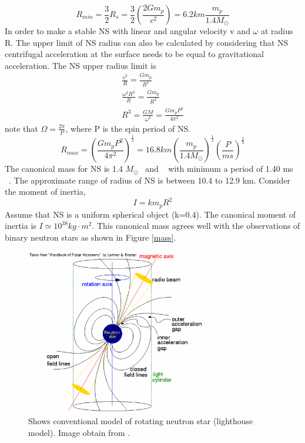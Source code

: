 \documentclass[thesis_msc.tex]{subfiles}
\begin{document}
        \begin{equation} \label{rmin}
    R_{min}=\frac{3}{2} R_s = \frac{3}{2}(\frac{2Gm_p}{c^2})=6.2km \frac{m_p}{1.4M_\odot}
    \end{equation}
In order to make a stable NS with linear and angular velocity v and $\omega$ at radius R. The upper limit of NS radius can also be calculated by considering that NS centrifugal acceleration at the surface needs to be equal to gravitational acceleration. The NS upper radius limit is
    \begin{eqnarray}
    \frac{v^2}{R}=\frac{Gm_p}{R^2}\\
    \frac{\omega^2 R^2}{R}=\frac{Gm_p}{R^2}\\
    R^3=\frac{GM}{\omega^2}=\frac{Gm_pP^2}{4\pi^2}
    \end{eqnarray}
    note that $\Omega=\frac{2\pi}{P}$, where P is the spin period of NS.
    \begin{equation} \label{rmax}
    R_{max}=(\frac{Gm_pP^2}{4\pi^2})^{\frac{1}{3}}=16.8km (\frac{m_p}{1.4M_\odot})^{\frac{1}{3}}(\frac{P}{ms})^{\frac{2}{3}}
    \end{equation}
    The canonical mass for NS is 1.4 $M_\odot$~\citep{stairs2004pulsars} and ~\citep{antoniadis2016millisecond} with minimum a period of 1.40 ms ~\citep{bassa2017lofar}. The approximate range of radius of NS is between 10.4 to 12.9 km. Consider the moment of inertia,   
   \begin{equation} \label{I}
   I=km_pR^2
   \end{equation}
Assume that NS is a uniform spherical object (k=0.4). The canonical moment of inertia is $I\simeq 10^{38} kg\cdot m^2$. This canonical mass agrees well with the observations of binary neutron stars as shown in Figure \ref{mass}. 
    \begin{center}
\begin{figure}[h] \centering
\includegraphics[width=0.7\textwidth]{figures/lhmodel.png}
\caption{Shows conventional model of rotating neutron star (lighthouse model). Image obtain from \citep{handbook}.  }
\label{lhmodel}
\end{figure}
\end{center}   
\end{document}

